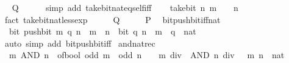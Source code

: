 \begin{isabellebody}
\ \isamarkupfalse%
\ {\isacartoucheopen}{\isacharquery}{\kern0pt}Q{\isacartoucheclose}\isanewline
\ \ \ \ \isamarkupfalse%
\ {\isacharparenleft}{\kern0pt}simp\ add{\isacharcolon}{\kern0pt}\ take{\isacharunderscore}{\kern0pt}bit{\isacharunderscore}{\kern0pt}nat{\isacharunderscore}{\kern0pt}eq{\isacharunderscore}{\kern0pt}self{\isacharunderscore}{\kern0pt}iff{\isacharparenright}{\kern0pt}\isanewline
{}\isamarkupfalse%
\isanewline
\ \ \isamarkupfalse%
\ {\isacartoucheopen}take{\isacharunderscore}{\kern0pt}bit\ n\ m\ {\isacharless}{\kern0pt}\ {}\ {\isacharcircum}{\kern0pt}\ n{\isacartoucheclose}\isanewline
\ \ \ \ \isamarkupfalse%
\ {\isacharparenleft}{\kern0pt}fact\ take{\isacharunderscore}{\kern0pt}bit{\isacharunderscore}{\kern0pt}nat{\isacharunderscore}{\kern0pt}less{\isacharunderscore}{\kern0pt}exp{\isacharparenright}{\kern0pt}\isanewline
\ \ \isamarkupfalse%
\ \isamarkupfalse%
\ {\isacharquery}{\kern0pt}Q\isanewline
\ \ \isamarkupfalse%
\ \isamarkupfalse%
\ {\isacharquery}{\kern0pt}P\ \isacommand{{\isachardot}{\kern0pt}}\isamarkupfalse%
\isanewline
{}\isamarkupfalse%
%
\endisatagproof
{\isafoldproof}%
%
\isadelimproof
\isanewline
%
\endisadelimproof
\isanewline
{}\isamarkupfalse%
\ bit{\isacharunderscore}{\kern0pt}push{\isacharunderscore}{\kern0pt}bit{\isacharunderscore}{\kern0pt}iff{\isacharunderscore}{\kern0pt}nat{\isacharcolon}{\kern0pt}\isanewline
\ \ {\isacartoucheopen}bit\ {\isacharparenleft}{\kern0pt}push{\isacharunderscore}{\kern0pt}bit\ m\ q{\isacharparenright}{\kern0pt}\ n\ {\isasymlongleftrightarrow}\ m\ {\isasymle}\ n\ {\isasymand}\ bit\ q\ {\isacharparenleft}{\kern0pt}n\ {\isacharminus}{\kern0pt}\ m{\isacharparenright}{\kern0pt}{\isacartoucheclose}\ \ q\ {\isacharcolon}{\kern0pt}{\isacharcolon}{\kern0pt}\ nat\isanewline
%
\isadelimproof
\ \ %
\endisadelimproof
%
\isatagproof
{}\isamarkupfalse%
\ {\isacharparenleft}{\kern0pt}auto\ simp\ add{\isacharcolon}{\kern0pt}\ bit{\isacharunderscore}{\kern0pt}push{\isacharunderscore}{\kern0pt}bit{\isacharunderscore}{\kern0pt}iff{\isacharparenright}{\kern0pt}%
\endisatagproof
{\isafoldproof}%
%
\isadelimproof
\isanewline
%
\endisadelimproof
\isanewline
{}\isamarkupfalse%
\ and{\isacharunderscore}{\kern0pt}nat{\isacharunderscore}{\kern0pt}rec{\isacharcolon}{\kern0pt}\isanewline
\ \ {\isacartoucheopen}m\ AND\ n\ {\isacharequal}{\kern0pt}\ of{\isacharunderscore}{\kern0pt}bool\ {\isacharparenleft}{\kern0pt}odd\ m\ {\isasymand}\ odd\ n{\isacharparenright}{\kern0pt}\ {\isacharplus}{\kern0pt}\ {}\ {\isacharasterisk}{\kern0pt}\ {\isacharparenleft}{\kern0pt}{\isacharparenleft}{\kern0pt}m\ div\ {}{\isacharparenright}{\kern0pt}\ AND\ {\isacharparenleft}{\kern0pt}n\ div\ {}{\isacharparenright}{\kern0pt}{\isacharparenright}{\kern0pt}{\isacartoucheclose}\ \ m\ n\ {\isacharcolon}{\kern0pt}{\isacharcolon}{\kern0pt}\ nat\isanewline

\end{isabellebody}
